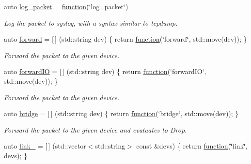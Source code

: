 \begin{DoxyCompactItemize}
auto \hyperlink{namespacepfq_1_1lang_1_1anonymous__namespace_02default_8hpp_03_aed6076a98aece625738cbda3689183e2}{log\+\_\+packet} = \hyperlink{namespacepfq_1_1lang_a1a4638059d700ae08d0ca63886ff2bb3}{function}(\char`\"{}log\+\_\+packet\char`\"{})
\begin{DoxyCompactList}\small\item\em Log the packet to syslog, with a syntax similar to tcpdump. \end{DoxyCompactList}\item 
auto \hyperlink{namespacepfq_1_1lang_1_1anonymous__namespace_02default_8hpp_03_aae08247030fea0f5e398b0a03d382257}{forward} = \mbox{[}$\,$\mbox{]} (std\+::string dev) \{ return \hyperlink{namespacepfq_1_1lang_a1a4638059d700ae08d0ca63886ff2bb3}{function}(\char`\"{}forward\char`\"{}, std\+::move(dev)); \}
\begin{DoxyCompactList}\small\item\em Forward the packet to the given device. \end{DoxyCompactList}\item 
auto \hyperlink{namespacepfq_1_1lang_1_1anonymous__namespace_02default_8hpp_03_a3fb6ec42e38c3329534ea3a7024fd967}{forward\+IO} = \mbox{[}$\,$\mbox{]} (std\+::string dev) \{ return \hyperlink{namespacepfq_1_1lang_a1a4638059d700ae08d0ca63886ff2bb3}{function}(\char`\"{}forward\+IO\char`\"{}, std\+::move(dev)); \}
\begin{DoxyCompactList}\small\item\em Forward the packet to the given device. \end{DoxyCompactList}\item 
auto \hyperlink{namespacepfq_1_1lang_1_1anonymous__namespace_02default_8hpp_03_ad318dd8fb6441b78bdfb056173e5a7e2}{bridge} = \mbox{[}$\,$\mbox{]} (std\+::string dev) \{ return \hyperlink{namespacepfq_1_1lang_a1a4638059d700ae08d0ca63886ff2bb3}{function}(\char`\"{}bridge\char`\"{}, std\+::move(dev)); \}
\begin{DoxyCompactList}\small\item\em Forward the packet to the given device and evaluates to {\ttfamily Drop}. \end{DoxyCompactList}\item 
auto \hyperlink{namespacepfq_1_1lang_1_1anonymous__namespace_02default_8hpp_03_aaad98f847b8e4c53a5ddec3c93b05296}{link\+\_\+} = \mbox{[}$\,$\mbox{]} (std\+::vector$<$std\+::string$>$ const \&devs) \{ return \hyperlink{namespacepfq_1_1lang_a1a4638059d700ae08d0ca63886ff2bb3}{function}(\char`\"{}link\char`\"{}, devs); \}

\end{DoxyCompactItemize}
